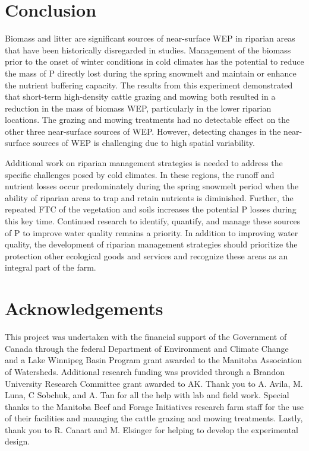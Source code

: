 \documentclass[
]{agujournal2019}
\begin{document}
\section{Conclusion}\label{conclusion}

Biomass and litter are significant sources of near-surface WEP in
riparian areas that have been historically disregarded in studies.
Management of the biomass prior to the onset of winter conditions in
cold climates has the potential to reduce the mass of P directly lost
during the spring snowmelt and maintain or enhance the nutrient
buffering capacity. The results from this experiment demonstrated that
short-term high-density cattle grazing and mowing both resulted in a
reduction in the mass of biomass WEP, particularly in the lower riparian
locations. The grazing and mowing treatments had no detectable effect on
the other three near-surface sources of WEP. However, detecting changes
in the near-surface sources of WEP is challenging due to high spatial
variability.

Additional work on riparian management strategies is needed to address
the specific challenges posed by cold climates. In these regions, the
runoff and nutrient losses occur predominately during the spring
snowmelt period when the ability of riparian areas to trap and retain
nutrients is diminished. Further, the repeated FTC of the vegetation and
soils increases the potential P losses during this key time. Continued
research to identify, quantify, and manage these sources of P to improve
water quality remains a priority. In addition to improving water
quality, the development of riparian management strategies should
prioritize the protection other ecological goods and services and
recognize these areas as an integral part of the farm.

\section*{Acknowledgements}\label{acknowledgements}

This project was undertaken with the financial support of the Government
of Canada through the federal Department of Environment and Climate
Change and a Lake Winnipeg Basin Program grant awarded to the Manitoba
Association of Watersheds. Additional research funding was provided
through a Brandon University Research Committee grant awarded to AK.
Thank you to A. Avila, M. Luna, C Sobchuk, and A. Tan for all the help
with lab and field work. Special thanks to the Manitoba Beef and Forage
Initiatives research farm staff for the use of their facilities and
managing the cattle grazing and mowing treatments. Lastly, thank you to
R. Canart and M. Elsinger for helping to develop the experimental
design.
\end{document}
